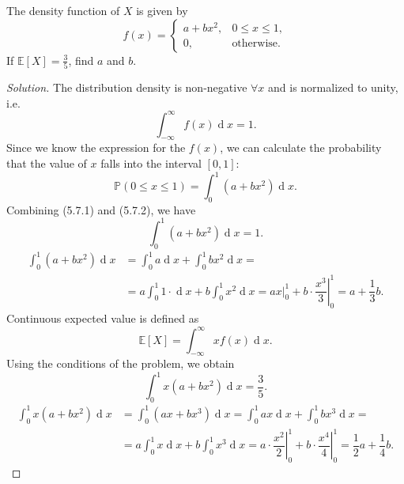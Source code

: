 \documentclass{article}[12pt]
\newenvironment{solution}
  {\renewcommand\qedsymbol{$\blacksquare$}\begin{proof}[Solution]}
  {\end{proof}}
\newenvironment{problem}[1]
  {\renewcommand\theinnercustomprblm{#1}\innercustomprblm}
  {\endinnercustomprblm}
\DeclareMathOperator{\dif}{d}
\renewcommand{\P}{\mathbb{P}}
\newcommand{\E}{\mathbb{E}}
\begin{document}
\begin{problem}{5.7}\normalfont
The density function of $X$ is given by
\begin{equation*}
    f(x) = 
    \begin{cases}
    a + bx^{2},& 0 \leqslant x \leqslant 1,
    \\
    0, &\text{otherwise.}
    \end{cases}
\end{equation*}
If $\E[X] = \tfrac{3}{5}$, find $a$ and $b$.
\end{problem}
\begin{solution}
The distribution density is non-negative $\forall x$ and is normalized to unity, i.e.
\begin{equation*}
    \int_{-\infty}^{\infty}f(x)\dif x = 1.\tag{5.7.1}
\end{equation*}
Since we know the expression for the $f(x)$, we can calculate the probability that the value of $x$ falls into the interval $[0, 1]$:
\begin{equation*}
    \P(0\leqslant x\leqslant 1) = \int_{0}^{1}\left(a + bx^{2}\right)\dif x.\tag{5.7.2}
\end{equation*}
Combining (5.7.1) and (5.7.2), we have
\begin{equation*}
    \int_{0}^{1}\left(a + bx^{2}\right)\dif x = 1.
\end{equation*}
\begin{align*}
    \int_{0}^{1}\left(a + bx^{2}\right)\dif x &= \int_{0}^{1}a\dif x + \int_{0}^{1}bx^{2}\dif x =
    \\
    &= a\int_{0}^{1}1\cdot\dif x + b\int_{0}^{1}x^{2}\dif x = ax|_{0}^{1} + b\cdot\left.\dfrac{x^{3}}{3}\right|_{0}^{1} =  a + \dfrac{1}{3}b.\tag{5.7.3}
\end{align*}
Continuous expected value is defined as
\begin{equation*}
    \E[X] = \int_{-\infty}^{\infty}xf(x)\dif x.
\end{equation*}
Using the conditions of the problem, we obtain
\begin{equation*}
    \int_{0}^{1}x(a + bx^{2})\dif x = \dfrac{3}{5}.
\end{equation*}
\begin{align*}
    \int_{0}^{1}x(a + bx^{2})\dif x &=\int_{0}^{1}(ax + bx^{3})\dif x =\int_{0}^{1}ax\dif x + \int_{0}^{1}bx^{3}\dif x = 
    \\
    &= a\int_{0}^{1}x\dif x + b\int_{0}^{1}x^{3}\dif x = a\cdot\left.\dfrac{x^{2}}{2}\right|_{0}^{1} + b\cdot\left.\dfrac{x^{4}}{4}\right|_{0}^{1} = \dfrac{1}{2}a + \dfrac{1}{4}b.\tag{5.7.4}

\end{align*}
\end{solution}
\end{document}
